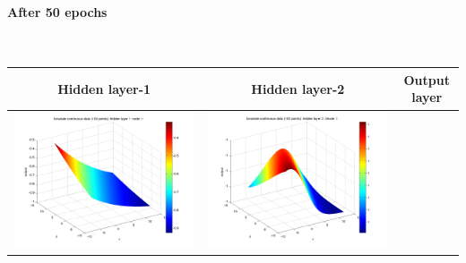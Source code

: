 \documentclass[fleqn]{article}
\newcommand{\myparagraph}[1]{\paragraph{#1}\mbox{}\\}
\begin{document}
\myparagraph{After 50 epochs}
\begin{center}
  \begin{longtable}{ c | c | r }
	\multicolumn{1}{c}{Hidden layer-1 } & 
	\multicolumn{1}{c}{Hidden layer-2 } & 
	\multicolumn{1}{c}{Output layer} \\
    \hline
    \includegraphics[scale=0.25]{./pics/bivariate100/_2_4/_2_4_epoch_50_hidden layer 1 :1}  &  \includegraphics[scale=0.25]{./pics/bivariate100/_2_4/_2_4_epoch_50_hidden layer 2 :21} &  \\ 

\end{longtable}
\end{center}
\end{document}
